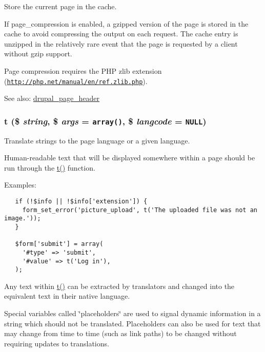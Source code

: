 Store the current page in the cache.

If page\_\-compression is enabled, a gzipped version of the page is stored in the cache to avoid compressing the output on each request. The cache entry is unzipped in the relatively rare event that the page is requested by a client without gzip support.

Page compression requires the PHP zlib extension (\href{http://php.net/manual/en/ref.zlib.php}{\tt http://php.net/manual/en/ref.zlib.php}).

\begin{Desc}
\item[See also:]\hyperlink{bootstrap_8inc_05f3dc0377da7898b9cb53977c30cca6}{drupal\_\-page\_\-header} \end{Desc}
\hypertarget{common_8inc_41d20f0c822bf1f3c26a97981c762665}{
\subsubsection[{t}]{\setlength{\rightskip}{0pt plus 5cm}t (\$ {\em string}, \/  \$ {\em args} = {\tt array()}, \/  \$ {\em langcode} = {\tt NULL})}}
\label{common_8inc_41d20f0c822bf1f3c26a97981c762665}


Translate strings to the page language or a given language.

Human-readable text that will be displayed somewhere within a page should be run through the \hyperlink{common_8inc_41d20f0c822bf1f3c26a97981c762665}{t()} function.

Examples: 

\begin{Code}\begin{verbatim}   if (!$info || !$info['extension']) {
     form_set_error('picture_upload', t('The uploaded file was not an image.'));
   }

   $form['submit'] = array(
     '#type' => 'submit',
     '#value' => t('Log in'),
   );
\end{verbatim}
\end{Code}



Any text within \hyperlink{common_8inc_41d20f0c822bf1f3c26a97981c762665}{t()} can be extracted by translators and changed into the equivalent text in their native language.

Special variables called \char`\"{}placeholders\char`\"{} are used to signal dynamic information in a string which should not be translated. Placeholders can also be used for text that may change from time to time (such as link paths) to be changed without requiring updates to translations.

